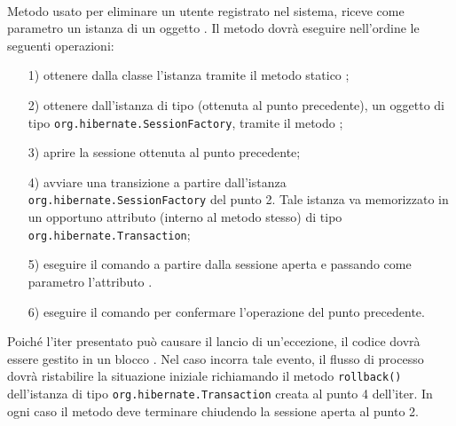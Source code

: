 \begin{description}
	\item{}\\
	Metodo usato per eliminare un utente registrato nel sistema, riceve come parametro un istanza di un oggetto . Il metodo dovrà eseguire nell'ordine le seguenti operazioni:
		\begin{itemize}
			\item[1)] ottenere dalla classe  l'istanza tramite il metodo statico ;
			\item[2)] ottenere dall'istanza di tipo (ottenuta al punto precedente), un oggetto di tipo \texttt{org.hibernate.SessionFactory}, tramite il metodo ;
			\item[3)] aprire la sessione ottenuta al punto precedente;
			\item[4)] avviare una transizione a partire dall'istanza \texttt{org.hibernate.SessionFactory} del punto 2. Tale istanza va memorizzato in un opportuno attributo (interno al metodo stesso) di tipo \texttt{org.hibernate.Transaction};
			\item[5)] eseguire il comando  a partire dalla sessione aperta e passando come parametro l'attributo .
			\item[6)] eseguire il comando  per confermare l'operazione del punto precedente.
		\end{itemize}
		
Poiché l'iter presentato può causare il lancio di un'eccezione, il codice dovrà essere gestito in un blocco . Nel caso incorra tale evento, il flusso di processo dovrà ristabilire la situazione iniziale richiamando il metodo \texttt{rollback()} dell'istanza di tipo \texttt{org.hibernate.Transaction} creata al punto 4 dell'iter. In ogni caso il metodo deve terminare chiudendo la sessione aperta al punto 2.


\end{description}

